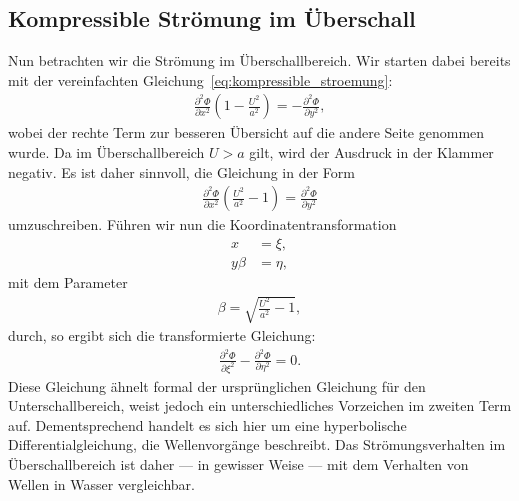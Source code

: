 \subsection{Kompressible Strömung im Überschall}
Nun betrachten wir die Strömung im Überschallbereich.
Wir starten dabei bereits mit der vereinfachten 
Gleichung~\eqref{eq:kompressible_stroemung}:
\begin{align*}
    \frac{\partial^2 \Phi}{\partial x^2}
    \left(1 - \frac{U^2}{a^2}\right)
    =
    -\frac{\partial^2 \Phi}{\partial y^2},
\end{align*}
wobei der rechte Term zur besseren Übersicht auf die 
andere Seite genommen wurde.
Da im Überschallbereich $U > a$ gilt, wird der Ausdruck 
in der Klammer negativ.
Es ist daher sinnvoll, die Gleichung in der Form
\begin{align*}
    \frac{\partial^2 \Phi}{\partial x^2}
    \left(\frac{U^2}{a^2} - 1\right)
    =
    \frac{\partial^2 \Phi}{\partial y^2}
\end{align*}
umzuschreiben.
Führen wir nun die Koordinatentransformation
\begin{align*}
    x 
    &= 
    \xi, \\
    y \beta 
    &= 
    \eta,
\end{align*}
mit dem Parameter
\begin{align*}
    \beta = \sqrt{\frac{U^2}{a^2} - 1},
\end{align*}
durch,
so ergibt sich die transformierte Gleichung:
\begin{align}
    \frac{\partial^2 \Phi}{\partial \xi^2}
    -
    \frac{\partial^2 \Phi}{\partial \eta^2}
    =
    0.\label{eq:wellengl_ueberschall}
\end{align}
Diese Gleichung ähnelt formal der ursprünglichen Gleichung 
für den Unterschallbereich, weist jedoch ein 
unterschiedliches Vorzeichen im zweiten Term auf.
Dementsprechend handelt es sich hier um eine hyperbolische 
Differentialgleichung, die Wellenvorgänge beschreibt.
%
Das Strömungsverhalten im Überschallbereich ist daher ---
in gewisser Weise --- mit dem Verhalten von Wellen in Wasser vergleichbar.
%

